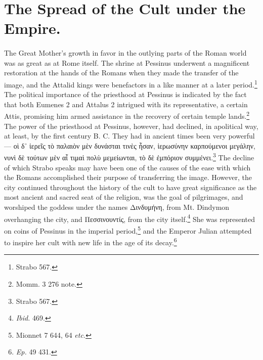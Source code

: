 \documentclass[a4paper, 11pt, oneside, polutonikogreek, english]{article}
\begin{document}
\section{The Spread of the Cult under the Empire.}
\paragraph{}
The Great Mother's growth in favor in the outlying parts of the Roman world was as great as at Rome itself. The shrine at Pessinus underwent a magnificent restoration at the hands of the Romans when they made the transfer of the image, and the Attalid kings were benefactors in a like manner at a later period.\footnote{Strabo 567.} The political importance of the priesthood at Pessinus is indicated by the fact that both Eumenes 2 and Attalus 2 intrigued with its representative, a certain Attis, promising him armed assistance in the recovery of certain temple lands.\footnote{Momm. 3 276 note.} The power of the priesthood at Pessinus, however, had declined, in apolitical way, at least, by the first century B. C. They had in ancient times been very powerful --- οὶ δ᾽ ἱερεῖς τὸ παλαιὸν μὲν δυνάσται τινὲς ἦσαν, ἱερωσύνην καρπούμενοι μεγάλην, νυνὶ δὲ τούτων μὲν αἷ τιμαὶ πολὺ μεμείωνται, τὸ δὲ ἐμπόριον συμμένει.\footnote{Strabo 567.} The decline of which Strabo speaks may have been one of the causes of the ease with which the Romans accomplished their purpose of transferring the image. However, the city continued throughout the history of the cult to have great significance as the most ancient and sacred seat of the religion, was the goal of pilgrimages, and worshiped the goddess under the names Δινδυμήνη, from Mt. Dindymon overhanging the city, and Πεσσινουντίς, from the city itself.\footnote{\emph{Ibid.} 469.} She was represented on coins of Pessinus in the imperial period,\footnote{Mionnet 7 644, 64 \emph{etc.}} and the Emperor Julian attempted to inspire her cult with new life in the age of its decay.\footnote{\emph{Ep.} 49 431.}
\end{document}
